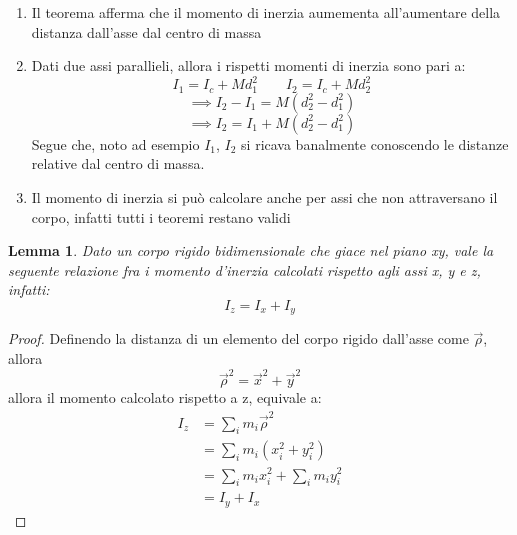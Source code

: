 \documentclass[11pt, a4paper, openright]{book}
\theoremstyle{plain}
\newtheorem{lemma}[theorem]{Lemma}
\theoremstyle{definition}
\begin{document}
\begin{enumerate}
    \item Il teorema afferma che il momento di inerzia aumementa all'aumentare della distanza dall'asse dal centro di massa
    \item Dati due assi parallieli, allora i rispetti momenti di inerzia sono pari a:
    \begin{equation}
        I_1 = I_c + Md_1^2 \quad \quad I_2 = I_c + Md_2^2    
    \end{equation}
    \begin{equation}
        \implies I_2 - I_1 = M(d_2^2 - d_1^2)
    \end{equation}
    \begin{equation}
        \implies I_2 = I_1 + M(d_2^2 - d_1^2)
    \end{equation}
    Segue che, noto ad esempio $I_1$, $I_2$ si ricava banalmente conoscendo le distanze relative dal centro di massa.
    \item Il momento di inerzia si può calcolare anche per assi che non attraversano il corpo, infatti tutti i teoremi restano validi
\end{enumerate}

\begin{lemma}
    Dato un corpo rigido bidimensionale che giace nel piano xy, vale la seguente relazione fra i momento d'inerzia calcolati rispetto agli assi x, y e z, infatti:
    \begin{equation}
        I_z = I_x + I_y
    \end{equation}
\end{lemma}
\begin{proof}
    Definendo la distanza di un elemento del corpo rigido dall'asse come $\vec{\rho}$, allora
    \begin{equation}
        \vec{\rho}^2 = \vec{x}^2 + \vec{y}^2
    \end{equation}
    allora il momento calcolato rispetto a z, equivale a:
    \begin{align}
        I_z & = \sum_i m_i \vec{\rho}^2 \\
        & = \sum_i m_i (x_i^2 + y_i^2) \\
        & = \sum_i m_i x_i^2 + \sum_i m_i y_i^2 \\
        & = I_y + I_x
    \end{align}
\end{proof}
\end{document}
